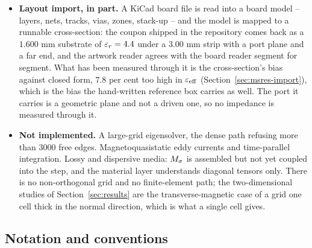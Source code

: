 \begin{itemize}[leftmargin=1.4em,itemsep=2pt]
        (Section~\ref{sec:res-scatter}), though the agreement the milestone asks for has not been reached.
        Waveguide ports and S-parameters remain unavailable, and with them every input impedance.
  \item[] \textbf{Layout import, in part.} A KiCad board file is read into a board model -- layers, nets,
        tracks, vias, zones, stack-up -- and the model is mapped to a runnable cross-section: the coupon shipped in
        the repository comes back as a $1.600$ mm substrate of $\varepsilon_r = 4.4$ under a $3.00$ mm strip with a port
        plane and a far end, and the artwork reader agrees with the board reader segment for segment. What has
        been measured through it is the cross-section's bias against closed form, $7.8$ per cent too high in
        $\varepsilon_{\mathrm{eff}}$ (Section~\ref{sec:msres-import}), which is the bias the hand-written reference box
        carries as well. The port it carries is a geometric plane and not a driven one, so no impedance is
        measured through it.
  \item[] \textbf{Not implemented.} A large-grid eigensolver, the dense path refusing
        more than 3000 free edges. Magnetoquasistatic eddy currents and time-parallel
        integration. Lossy and dispersive media: ${M_{\sigma}}$ is assembled but not yet coupled into the step, and
        the material layer understands diagonal tensors only. There is no non-orthogonal grid and no
        finite-element path; the two-dimensional studies of Section~\ref{sec:results} are the transverse-magnetic
        case of a grid one cell thick in the normal direction, which is what a single cell gives.
\end{itemize}

\subsection{Notation and conventions}

